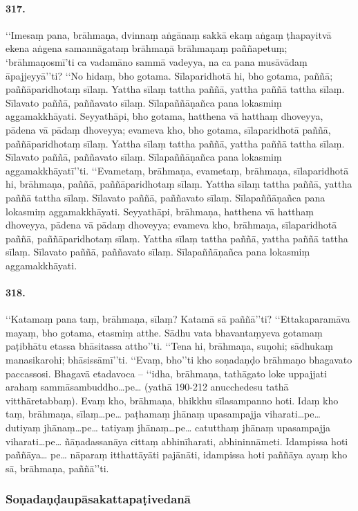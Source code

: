 \paragraph{317.} ‘‘Imesaṃ pana, brāhmaṇa, dvinnaṃ aṅgānaṃ sakkā ekaṃ aṅgaṃ ṭhapayitvā ekena aṅgena samannāgataṃ brāhmaṇā brāhmaṇaṃ paññapetuṃ; ‘brāhmaṇosmī’ti ca vadamāno sammā vadeyya, na ca pana musāvādaṃ āpajjeyyā’’ti? ‘‘No hidaṃ, bho gotama. Sīlaparidhotā hi, bho gotama, paññā; paññāparidhotaṃ sīlaṃ. Yattha sīlaṃ tattha paññā, yattha paññā tattha sīlaṃ. Sīlavato paññā, paññavato sīlaṃ. Sīlapaññāṇañca pana lokasmiṃ aggamakkhāyati. Seyyathāpi, bho gotama, hatthena vā hatthaṃ dhoveyya, pādena vā pādaṃ dhoveyya; evameva kho, bho gotama, sīlaparidhotā paññā, paññāparidhotaṃ sīlaṃ. Yattha sīlaṃ tattha paññā, yattha paññā tattha sīlaṃ. Sīlavato paññā, paññavato sīlaṃ. Sīlapaññāṇañca pana lokasmiṃ aggamakkhāyatī’’ti. ‘‘Evametaṃ, brāhmaṇa, evametaṃ, brāhmaṇa, sīlaparidhotā hi, brāhmaṇa, paññā, paññāparidhotaṃ sīlaṃ. Yattha sīlaṃ tattha paññā, yattha paññā tattha sīlaṃ. Sīlavato paññā, paññavato sīlaṃ. Sīlapaññāṇañca pana lokasmiṃ aggamakkhāyati. Seyyathāpi, brāhmaṇa, hatthena vā hatthaṃ dhoveyya, pādena vā pādaṃ dhoveyya; evameva kho, brāhmaṇa, sīlaparidhotā paññā, paññāparidhotaṃ sīlaṃ. Yattha sīlaṃ tattha paññā, yattha paññā tattha sīlaṃ. Sīlavato paññā, paññavato sīlaṃ. Sīlapaññāṇañca pana lokasmiṃ aggamakkhāyati.

\paragraph{318.} ‘‘Katamaṃ pana taṃ, brāhmaṇa, sīlaṃ? Katamā sā paññā’’ti? ‘‘Ettakaparamāva mayaṃ, bho gotama, etasmiṃ atthe. Sādhu vata bhavantaṃyeva gotamaṃ paṭibhātu etassa bhāsitassa attho’’ti. ‘‘Tena hi, brāhmaṇa, suṇohi; sādhukaṃ manasikarohi; bhāsissāmī’’ti. ‘‘Evaṃ, bho’’ti kho soṇadaṇḍo brāhmaṇo bhagavato paccassosi. Bhagavā etadavoca – ‘‘idha, brāhmaṇa, tathāgato loke uppajjati arahaṃ sammāsambuddho…pe… (yathā 190-212 anucchedesu tathā vitthāretabbaṃ). Evaṃ kho, brāhmaṇa, bhikkhu sīlasampanno hoti. Idaṃ kho taṃ, brāhmaṇa, sīlaṃ…pe… paṭhamaṃ jhānaṃ upasampajja viharati…pe… dutiyaṃ jhānaṃ…pe… tatiyaṃ jhānaṃ…pe… catutthaṃ jhānaṃ upasampajja viharati…pe… ñāṇadassanāya cittaṃ abhinīharati, abhininnāmeti. Idampissa hoti paññāya… pe… nāparaṃ itthattāyāti pajānāti, idampissa hoti paññāya ayaṃ kho sā, brāhmaṇa, paññā’’ti.

\subsubsection{Soṇadaṇḍaupāsakattapaṭivedanā}

